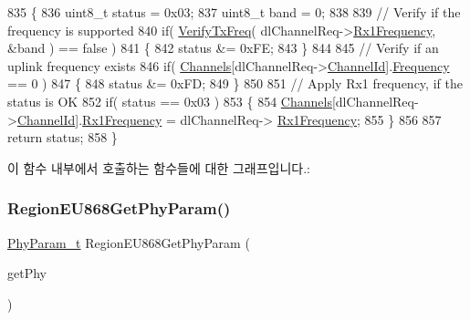 \begin{DoxyCode}
835 \{
836     uint8\_t status = 0x03;
837     uint8\_t band = 0;
838 
839     \textcolor{comment}{// Verify if the frequency is supported}
840     \textcolor{keywordflow}{if}( \mbox{\hyperlink{_region_e_u868_8c_a827497ee67461abdb257e1ff3f7e78e6}{VerifyTxFreq}}( dlChannelReq->\mbox{\hyperlink{structs_dl_channel_req_params_a8a564b8635b12d5f0f348ae177dd92e1}{Rx1Frequency}}, &band ) == \textcolor{keyword}{false} )
841     \{
842         status &= 0xFE;
843     \}
844 
845     \textcolor{comment}{// Verify if an uplink frequency exists}
846     \textcolor{keywordflow}{if}( \mbox{\hyperlink{_region_e_u868_8c_a2f381382b4cbbe721da7b980ec467229}{Channels}}[dlChannelReq->\mbox{\hyperlink{structs_dl_channel_req_params_ae23f953dc29c360e56a3c856404a3276}{ChannelId}}].\mbox{\hyperlink{structs_channel_params_ade3d190636488dad9a89b19446b7acf1}{Frequency}} == 0 )
847     \{
848         status &= 0xFD;
849     \}
850 
851     \textcolor{comment}{// Apply Rx1 frequency, if the status is OK}
852     \textcolor{keywordflow}{if}( status == 0x03 )
853     \{
854         \mbox{\hyperlink{_region_e_u868_8c_a2f381382b4cbbe721da7b980ec467229}{Channels}}[dlChannelReq->\mbox{\hyperlink{structs_dl_channel_req_params_ae23f953dc29c360e56a3c856404a3276}{ChannelId}}].\mbox{\hyperlink{structs_channel_params_a8a564b8635b12d5f0f348ae177dd92e1}{Rx1Frequency}} = dlChannelReq->
      \mbox{\hyperlink{structs_dl_channel_req_params_a8a564b8635b12d5f0f348ae177dd92e1}{Rx1Frequency}};
855     \}
856 
857     \textcolor{keywordflow}{return} status;
858 \}
\end{DoxyCode}
이 함수 내부에서 호출하는 함수들에 대한 그래프입니다.\+:
\mbox{\label{group___r_e_g_i_o_n_e_u868_ga4150dec3b05b9774aedf4e2e32499fd3}} 
\subsubsection{\texorpdfstring{Region\+E\+U868\+Get\+Phy\+Param()}{RegionEU868GetPhyParam()}}
{\footnotesize\ttfamily \mbox{\hyperlink{group___r_e_g_i_o_n_gaed159b26e5c4677236b6e8677019db30}{Phy\+Param\+\_\+t}} Region\+E\+U868\+Get\+Phy\+Param (\begin{DoxyParamCaption}\item[{\mbox{\hyperlink{group___r_e_g_i_o_n_gab471483fff904f4f89bbc03f7fc380ab}{Get\+Phy\+Params\+\_\+t}} $\ast$}]{get\+Phy }\end{DoxyParamCaption})}



